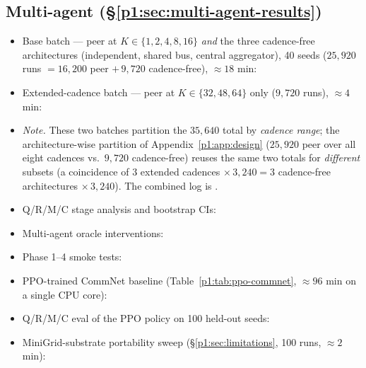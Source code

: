 \documentclass{article}
\begin{document}
\subsection*{Multi-agent (\S\ref{p1:sec:multi-agent-results})}
\begin{itemize}[leftmargin=16pt]
\item Base batch --- peer at $K\in\{1,2,4,8,16\}$ \emph{and} the three cadence-free architectures (independent, shared bus, central aggregator), 40 seeds ($25{,}920$ runs $=16{,}200$ peer $+\,9{,}720$ cadence-free), $\approx 18$ min:
\item Extended-cadence batch --- peer at $K\in\{32,48,64\}$ only ($9{,}720$ runs), $\approx 4$ min:
\item[] \emph{Note.} These two batches partition the $35{,}640$ total by \emph{cadence range}; the architecture-wise partition of Appendix~\ref{p1:app:design} ($25{,}920$ peer over all eight cadences vs.\ $9{,}720$ cadence-free) reuses the same two totals for \emph{different} subsets (a coincidence of $3$ extended cadences $\times\,3{,}240 = 3$ cadence-free architectures $\times\,3{,}240$). The combined log is .
\item Q/R/M/C stage analysis and bootstrap CIs:
\item Multi-agent oracle interventions:
\item Phase 1--4 smoke tests:
\item PPO-trained CommNet baseline (Table~\ref{p1:tab:ppo-commnet}, $\approx 96$ min on a single CPU core):
\item Q/R/M/C eval of the PPO policy on 100 held-out seeds:
\item MiniGrid-substrate portability sweep (\S\ref{p1:sec:limitations}, 100 runs, $\approx 2$ min):
\end{itemize}
\end{document}
